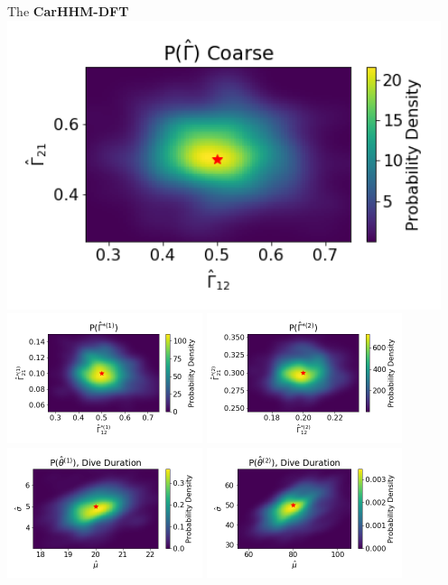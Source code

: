 \documentclass[12pt]{TD-CJS}
\begin{document}
\centering
The \textbf{CarHHM-DFT}
\includegraphics[width=5in]{../Plots/hhmm_FV_Gamma_density_-1.png}
\includegraphics[width=2.25in]{../Plots/hhmm_FV_Gamma_density_0.png}
\includegraphics[width=2.25in]{../Plots/hhmm_FV_Gamma_density_1.png}
\includegraphics[width=2.25in]{../Plots/hhmm_FV_MLE_density_dive_duration_-1_0.png}
\includegraphics[width=2.25in]{../Plots/hhmm_FV_MLE_density_dive_duration_-1_1.png}
\end{document}

